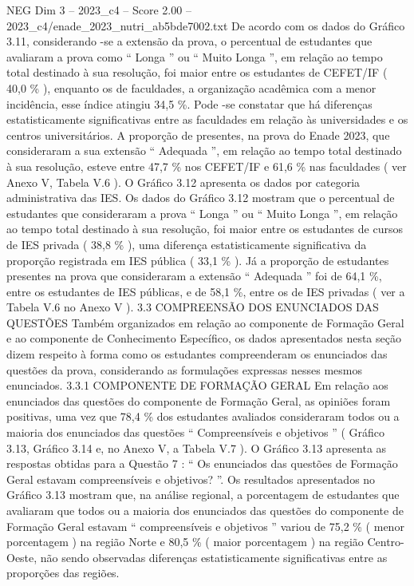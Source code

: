 \begin{textsample}{NEG Dim 3 – 2023\_c4 – Score 2.00 – 2023\_c4/enade\_2023\_nutri\_ab5bde7002.txt}
De acordo com os dados do Gráfico 3.11, considerando -se a extensão da prova, o percentual de estudantes que avaliaram a prova como “ Longa ” ou “ Muito Longa ”, em relação ao tempo total destinado à sua resolução, foi maior entre os estudantes de CEFET/IF ( 40,0 \% ), enquanto os de faculdades, a organização acadêmica com a menor incidência, esse índice atingiu 34,5 \%.
Pode -se constatar que há diferenças estatisticamente significativas entre as faculdades em relação às universidades e os centros universitários.
A proporção de presentes, na prova do Enade 2023, que consideraram a sua extensão “ Adequada ”, em relação ao tempo total destinado à sua resolução, esteve entre 47,7 \% nos CEFET/IF e 61,6 \% nas faculdades ( ver Anexo V, Tabela V.6 ).
O Gráfico 3.12 apresenta os dados por categoria administrativa das IES.
Os dados do Gráfico 3.12 mostram que o percentual de estudantes que consideraram a prova “ Longa ” ou “ Muito Longa ”, em relação ao tempo total destinado à sua resolução, foi maior entre os estudantes de cursos de IES privada ( 38,8 \% ), uma diferença estatisticamente significativa da proporção registrada em IES pública ( 33,1 \% ).
Já a proporção de estudantes presentes na prova que consideraram a extensão “ Adequada ” foi de 64,1 \%, entre os estudantes de IES públicas, e de 58,1 \%, entre os de IES privadas ( ver a Tabela V.6 no Anexo V ). 3.3 COMPREENSÃO DOS ENUNCIADOS DAS QUESTÕES Também organizados em relação ao componente de Formação Geral e ao componente de Conhecimento Específico, os dados apresentados nesta seção dizem respeito à forma como os estudantes compreenderam os enunciados das questões da prova, considerando as formulações expressas nesses mesmos enunciados. 3.3.1 COMPONENTE DE FORMAÇÃO GERAL Em relação aos enunciados das questões do componente de Formação Geral, as opiniões foram positivas, uma vez que 78,4 \% dos estudantes avaliados consideraram todos ou a maioria dos enunciados das questões “ Compreensíveis e objetivos ” ( Gráfico 3.13, Gráfico 3.14 e, no Anexo V, a Tabela V.7 ).
O Gráfico 3.13 apresenta as respostas obtidas para a Questão 7 : “ Os enunciados das questões de Formação Geral estavam compreensíveis e objetivos? ”.
Os resultados apresentados no Gráfico 3.13 mostram que, na análise regional, a porcentagem de estudantes que avaliaram que todos ou a maioria dos enunciados das questões do componente de Formação Geral estavam “ compreensíveis e objetivos ” variou de 75,2 \% ( menor porcentagem ) na região Norte e 80,5 \% ( maior porcentagem ) na região Centro-Oeste, não sendo observadas diferenças estatisticamente significativas entre as proporções das regiões.

\end{textsample}
